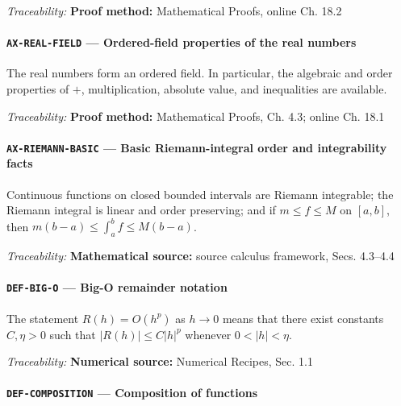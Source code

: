 \documentclass[10pt]{article}
\newcommand{\pidraw}[1]{\begingroup\urlstyle{tt}\nolinkurl{#1}\endgroup}
\theoremstyle{definition}
\theoremstyle{remark}
\begin{document}
\smallskip\noindent\textit{Traceability:} \textbf{Proof method:} Mathematical Proofs, online Ch. 18.2\par

\label{prf:AX-REAL-FIELD}

\paragraph{\pidraw{AX-REAL-FIELD} --- Ordered-field properties of the real numbers}

The real numbers form an ordered field. In particular, the algebraic and order properties of $+$, multiplication, absolute value, and inequalities are available.

\smallskip\noindent\textit{Traceability:} \textbf{Proof method:} Mathematical Proofs, Ch. 4.3; online Ch. 18.1\par

\label{prf:AX-RIEMANN-BASIC}

\paragraph{\pidraw{AX-RIEMANN-BASIC} --- Basic Riemann-integral order and integrability facts}

Continuous functions on closed bounded intervals are Riemann integrable; the Riemann integral is linear and order preserving; and if $m\le f\le M$ on $[a,b]$, then $m(b-a)\le\int_a^b f\le M(b-a)$.

\smallskip\noindent\textit{Traceability:} \textbf{Mathematical source:} source calculus framework, Secs. 4.3--4.4\par

\label{prf:DEF-BIG-O}

\paragraph{\pidraw{DEF-BIG-O} --- Big-O remainder notation}

The statement $R(h)=O(h^p)$ as $h\to0$ means that there exist constants $C,\eta>0$ such that $|R(h)|\le C|h|^p$ whenever $0<|h|<\eta$.

\smallskip\noindent\textit{Traceability:} \textbf{Numerical source:} Numerical Recipes, Sec. 1.1\par

\label{prf:DEF-COMPOSITION}

\paragraph{\pidraw{DEF-COMPOSITION} --- Composition of functions}
\end{document}
